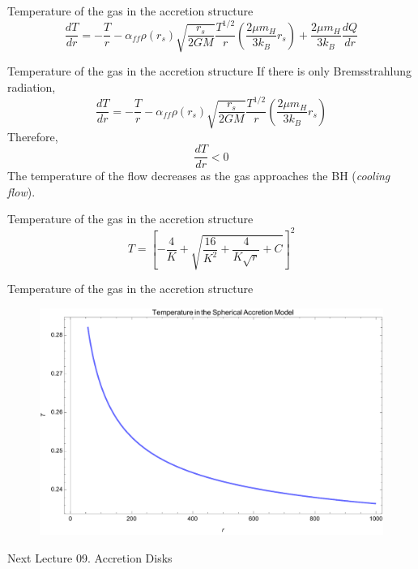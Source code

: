 \documentclass{beamer}
\begin{document}
\begin{darkframes}
\begin{frame}{Temperature of the gas in the accretion structure}
	\[ \frac{dT}{dr} = - \frac{T}{r} - \alpha_{ff} \rho(r_s) \sqrt{\frac{r_s}{2GM}} \frac{T^{1/2}}{r} 
	\left( \frac{2\mu m_H}{3k_B} r_s\right) + \frac{2\mu m_H}{3k_B} \frac{dQ}{dr} \]
\end{frame}

\begin{frame}{Temperature of the gas in the accretion structure}
	If there is only Bremsstrahlung radiation, 	
	\[ \frac{dT}{dr} = - \frac{T}{r} - \alpha_{ff} \rho(r_s) \sqrt{\frac{r_s}{2GM}} \frac{T^{1/2}}{r} 
	\left( \frac{2\mu m_H}{3k_B} r_s\right) \]
	\pause
	Therefore,
	\[ \frac{dT}{dr}<0\]
	\pause
	The temperature of the flow decreases as the gas approaches the BH (\textit{cooling flow}).
\end{frame}

\begin{frame}{Temperature of the gas in the accretion structure}
	\[T = \left[ -\frac{4}{K} + \sqrt{\frac{16}{K^2} + \frac{4}{K\sqrt{r}} +C}\right]^2 \]
\end{frame}

\end{darkframes}
\begin{frame}{Temperature of the gas in the accretion structure}
	\begin{center}
      \begin{figure}
      	\includegraphics[scale=0.45] {figures/Temperature.pdf}
      \end{figure}
	\end{center}	
\end{frame}

\begin{darkframes}

\begin{frame}{Next Lecture}
  	\Large
	{09. Accretion Disks}
\end{frame}

  
\end{darkframes}
\end{document}
